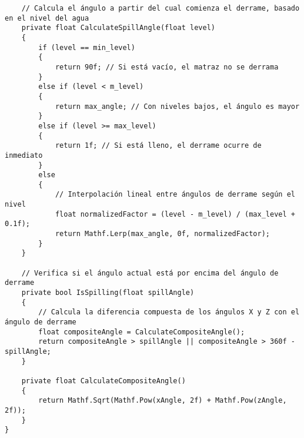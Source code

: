 \begin{verbatim}
    // Calcula el ángulo a partir del cual comienza el derrame, basado en el nivel del agua
    private float CalculateSpillAngle(float level)
    {
        if (level == min_level)
        {
            return 90f; // Si está vacío, el matraz no se derrama
        }
        else if (level < m_level)
        {
            return max_angle; // Con niveles bajos, el ángulo es mayor
        }
        else if (level >= max_level)
        {
            return 1f; // Si está lleno, el derrame ocurre de inmediato
        }
        else
        {
            // Interpolación lineal entre ángulos de derrame según el nivel
            float normalizedFactor = (level - m_level) / (max_level + 0.1f);
            return Mathf.Lerp(max_angle, 0f, normalizedFactor);
        }
    }

    // Verifica si el ángulo actual está por encima del ángulo de derrame
    private bool IsSpilling(float spillAngle)
    {
        // Calcula la diferencia compuesta de los ángulos X y Z con el ángulo de derrame
        float compositeAngle = CalculateCompositeAngle();
        return compositeAngle > spillAngle || compositeAngle > 360f - spillAngle;
    }

    private float CalculateCompositeAngle()
    {
        return Mathf.Sqrt(Mathf.Pow(xAngle, 2f) + Mathf.Pow(zAngle, 2f));
    }
}
\end{verbatim}